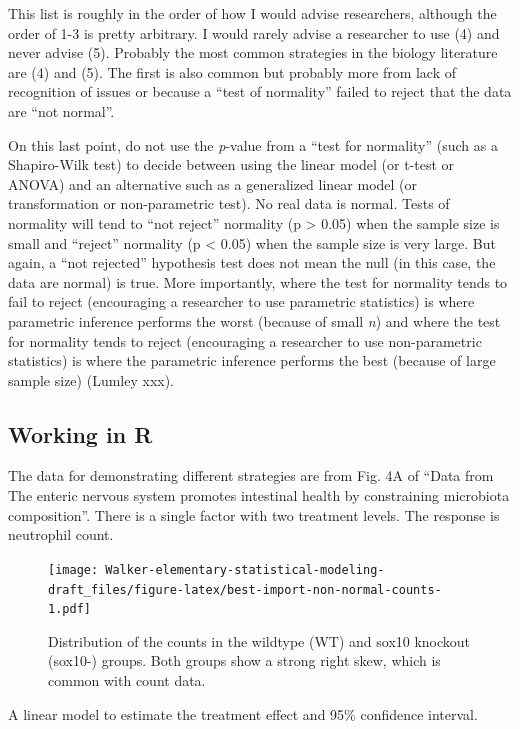 \documentclass[]{book}
\begin{document}
This list is roughly in the order of how I would advise researchers,
although the order of 1-3 is pretty arbitrary. I would rarely advise a
researcher to use (4) and never advise (5). Probably the most common
strategies in the biology literature are (4) and (5). The first is also
common but probably more from lack of recognition of issues or because a
``test of normality'' failed to reject that the data are ``not normal''.

On this last point, do not use the \emph{p}-value from a ``test for
normality'' (such as a Shapiro-Wilk test) to decide between using the
linear model (or t-test or ANOVA) and an alternative such as a
generalized linear model (or transformation or non-parametric test). No
real data is normal. Tests of normality will tend to ``not reject''
normality (p \textgreater{} 0.05) when the sample size is small and
``reject'' normality (p \textless{} 0.05) when the sample size is very
large. But again, a ``not rejected'' hypothesis test does not mean the
null (in this case, the data are normal) is true. More importantly,
where the test for normality tends to fail to reject (encouraging a
researcher to use parametric statistics) is where parametric inference
performs the worst (because of small \emph{n}) and where the test for
normality tends to reject (encouraging a researcher to use
non-parametric statistics) is where the parametric inference performs
the best (because of large sample size) (Lumley xxx).

\subsection{Working in R}\label{working-in-r-2}

The data for demonstrating different strategies are from Fig. 4A of
``Data from The enteric nervous system promotes intestinal health by
constraining microbiota composition''. There is a single factor with two
treatment levels. The response is neutrophil count.

\begin{figure}
\centering
\texttt{[image: Walker-elementary-statistical-modeling-draft\_files/figure-latex/best-import-non-normal-counts-1.pdf]}
\caption{\label{fig:best-import-non-normal-counts}Distribution of the counts
in the wildtype (WT) and sox10 knockout (sox10-) groups. Both groups
show a strong right skew, which is common with count data.}
\end{figure}

A linear model to estimate the treatment effect and 95\% confidence
interval.
\end{document}
